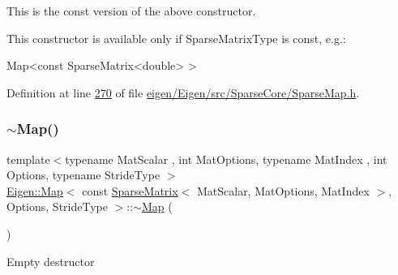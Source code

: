 This is the const version of the above constructor.

This constructor is available only if {\ttfamily Sparse\+Matrix\+Type} is const, e.\+g.\+: 
\begin{DoxyCode}
Map<const SparseMatrix<double> >  
\end{DoxyCode}
 

Definition at line \hyperlink{eigen_2_eigen_2src_2_sparse_core_2_sparse_map_8h_source_l00270}{270} of file \hyperlink{eigen_2_eigen_2src_2_sparse_core_2_sparse_map_8h_source}{eigen/\+Eigen/src/\+Sparse\+Core/\+Sparse\+Map.\+h}.

\mbox{\label{class_eigen_1_1_map_3_01const_01_sparse_matrix_3_01_mat_scalar_00_01_mat_options_00_01_mat_index4032bba20cf92aab8bcf07e926e15a4f_aa4b0d0dd528fef0e1f8ce8c043d42b21}} 
\subsubsection{\texorpdfstring{$\sim$\+Map()}{~Map()}\hspace{0.1cm}{\footnotesize\ttfamily [1/2]}}
{\footnotesize\ttfamily template$<$typename Mat\+Scalar , int Mat\+Options, typename Mat\+Index , int Options, typename Stride\+Type $>$ \\
\hyperlink{group___core___module_class_eigen_1_1_map}{Eigen\+::\+Map}$<$ const \hyperlink{group___sparse_core___module_class_eigen_1_1_sparse_matrix}{Sparse\+Matrix}$<$ Mat\+Scalar, Mat\+Options, Mat\+Index $>$, Options, Stride\+Type $>$\+::$\sim$\hyperlink{group___core___module_class_eigen_1_1_map}{Map} (\begin{DoxyParamCaption}{ }\end{DoxyParamCaption})\hspace{0.3cm}{\ttfamily [inline]}}

Empty destructor 

